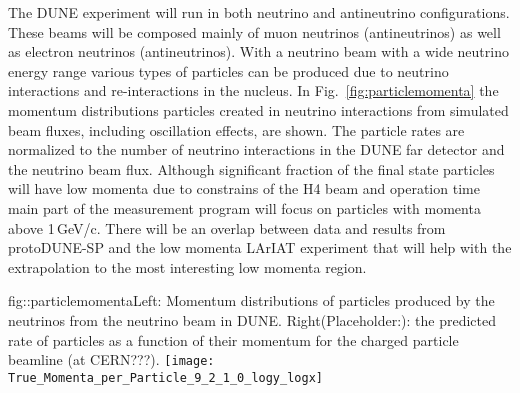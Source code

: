 The DUNE experiment will run in both neutrino and antineutrino 
configurations. These beams will be composed mainly of muon neutrinos (antineutrinos) as well as electron neutrinos (antineutrinos). With a neutrino beam with a wide neutrino energy range various types of particles can be produced due to neutrino interactions and re-interactions in the nucleus.  In Fig.~\ref{fig:particlemomenta} the momentum distributions particles created in 
neutrino interactions from simulated beam fluxes, including oscillation effects, are shown.  The particle rates are normalized  to the number of neutrino interactions in 
the DUNE far detector and the neutrino beam flux.  Although significant fraction of the final state particles will have low momenta due to constrains of the H4 beam and operation time main part of the measurement program will focus on particles with momenta above 1\,GeV/c. There will be an overlap between data and results from protoDUNE-SP and the low momenta LArIAT experiment that will help with the extrapolation to the most interesting low momenta region. 


\begin{cdrfigure} {fig::particlemomenta}{Left: Momentum distributions of particles produced by the neutrinos from the neutrino beam in DUNE. Right(Placeholder:): the predicted rate of particles as a function of their momentum for the charged particle beamline (at CERN???).} 
  \texttt{[image: True\_Momenta\_per\_Particle\_9\_2\_1\_0\_logy\_logx]}
\end{cdrfigure}

